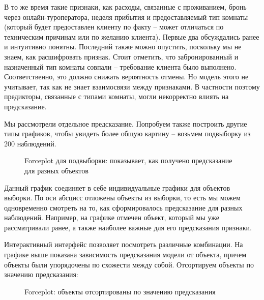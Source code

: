 В то же время такие признаки, как расходы, связанные с проживанием, бронь через онлайн-туроператора, неделя прибытия и предоставляемый тип комнаты (который будет предоставлен клиенту по факту -- может отличаться по техническим причинам или по желанию клиента). Первые два обсуждались ранее и интуитивно понятны. Последний также можно опустить, поскольку мы не знаем, как расшифровать признак. Стоит отметить, что забронированный и назначенный тип комнаты совпали -- требование клиента было выполнено. Соответственно, это должно снижать вероятность отмены. Но модель этого не учитывает, так как не знает взаимосвязи между признаками. В частности поэтому предикторы, связанные с типами комнаты, могли некорректно влиять на предсказание.

Мы рассмотрели отдельное предсказание. Попробуем также построить другие типы графиков, чтобы увидеть более общую картину -- возьмем подвыборку из 200 наблюдений.

\begin{figure}[h]
	\caption*{Forceplot для подвыборки: показывает, как получено предсказание для разных объектов}
\end{figure}

Данный график соединяет в себе индивидуальные графики для объектов выборки. По оси абсцисс отложены объекты из выборки, то есть мы можем одновременно смотреть на то, как сформировалось предсказание для разных наблюдений. Например, на графике отмечен объект, который мы уже рассматривали ранее, а также наиболее важные для его предсказания признаки.

Интерактивный интерфейс позволяет посмотреть различные комбинации. На графике выше показана зависимость предсказания модели от объекта, причем объекты были упорядочены по схожести между собой. Отсортируем объекты по значению предсказания:

\begin{figure}[h]
	\caption*{Forceplot: объекты отсортированы по значению предсказания}
\end{figure}

